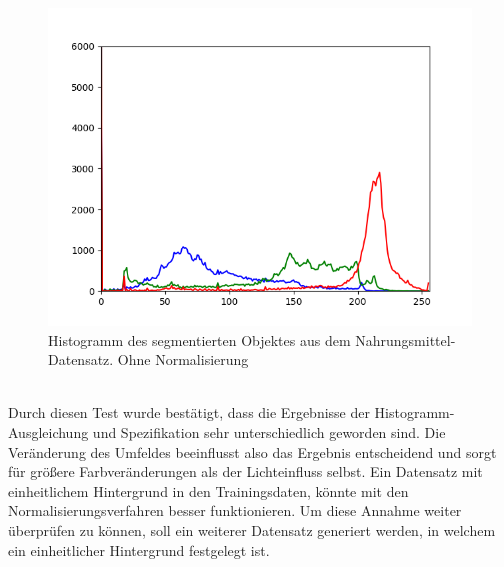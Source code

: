 \begin{figure}[htb]
\begin{minipage}[c]{0.08\textwidth}
\end{minipage}
\hfill
\begin{minipage}[c]{0.3\textwidth}
\includegraphics[width=\textwidth]{Sources/Bild2_histo.png}
\end{minipage}
\caption{Histogramm des segmentierten Objektes aus dem Nahrungsmittel-Datensatz. Ohne Normalisierung}
\label{img:evalnorm}
\end{figure}\\
Durch diesen Test wurde bestätigt, dass die Ergebnisse der Histogramm-Ausgleichung und Spezifikation sehr unterschiedlich geworden sind. Die Veränderung des Umfeldes beeinflusst also das Ergebnis entscheidend und sorgt für größere Farbveränderungen als der Lichteinfluss selbst.
Ein Datensatz mit einheitlichem Hintergrund in den Trainingsdaten, könnte mit den Normalisierungsverfahren besser funktionieren. Um diese Annahme weiter überprüfen zu können, soll ein weiterer Datensatz generiert werden, in welchem ein einheitlicher Hintergrund festgelegt ist. 
